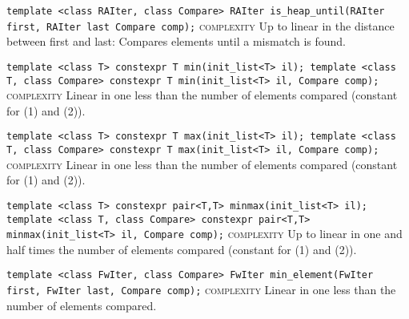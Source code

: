 \noindent{}\hspace*{0.25em}\lstinline[basicstyle=\ttfamily\color{corange}]{template <class RAIter, class Compare> RAIter is_heap_until(RAIter first, RAIter last Compare comp);} \textsc{complexity} Up to linear in the distance between first and last: Compares elements until a mismatch is found.\\\vspace{-0.6em}

\noindent{}\hspace*{0.25em}\lstinline[basicstyle=\ttfamily\color{corange}]{template <class T> constexpr T min(init_list<T> il); template <class T, class Compare> constexpr T min(init_list<T> il, Compare comp);} \textsc{complexity} Linear in one less than the number of elements compared (constant for (1) and (2)).\\\vspace{-0.6em}

\noindent{}\hspace*{0.25em}\lstinline[basicstyle=\ttfamily\color{corange}]{template <class T> constexpr T max(init_list<T> il); template <class T, class Compare> constexpr T max(init_list<T> il, Compare comp);} \textsc{complexity} Linear in one less than the number of elements compared (constant for (1) and (2)).\\\vspace{-0.6em}

\noindent{}\hspace*{0.25em}\lstinline[basicstyle=\ttfamily\color{corange}]{template <class T> constexpr pair<T,T> minmax(init_list<T> il); template <class T, class Compare> constexpr pair<T,T> minmax(init_list<T> il, Compare comp);} \textsc{complexity} Up to linear in one and half times the number of elements compared (constant for (1) and (2)).\\\vspace{-0.6em}

\noindent{}\hspace*{0.25em}\lstinline[basicstyle=\ttfamily\color{corange}]{template <class FwIter, class Compare> FwIter min_element(FwIter first, FwIter last, Compare comp);} \textsc{complexity} Linear in one less than the number of elements compared.\\\vspace{-0.6em}

